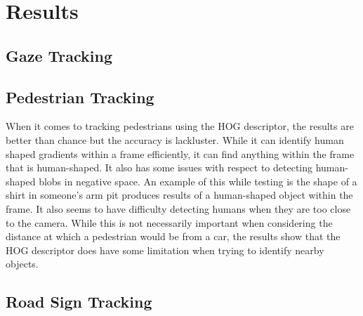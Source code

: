 \section{Results}

\subsection{Gaze Tracking}


\subsection{Pedestrian Tracking}
When it comes to tracking pedestrians using the HOG descriptor, the results are better than chance but the accuracy is lackluster. While it can identify human shaped gradients within a frame efficiently, it can find anything within the frame that is human-shaped. It also has some issues with respect to detecting human-shaped blobs in negative space. An example of this while testing is the shape of a shirt in someone's arm pit produces results of a human-shaped object within the frame. It also seems to have difficulty detecting humans when they are too close to the camera. While this is not necessarily important when considering the distance at which a pedestrian would be from a car, the results show that the HOG descriptor does have some limitation when trying to identify nearby objects.

\subsection{Road Sign Tracking}